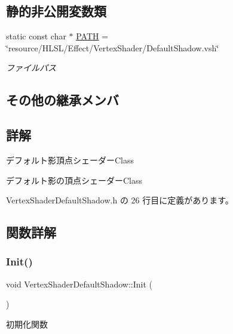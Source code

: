 \subsection*{静的非公開変数類}
\begin{DoxyCompactItemize}
\item 
static const char $\ast$ \mbox{\hyperlink{class_vertex_shader_default_shadow_ad456e5159f0ce67d6ad53f39732bccb1}{P\+A\+TH}} = \char`\"{}resource/H\+L\+SL/Effect/Vertex\+Shader/Default\+Shadow.\+vsh\char`\"{}
\begin{DoxyCompactList}\small\item\em ファイルパス \end{DoxyCompactList}\end{DoxyCompactItemize}
\subsection*{その他の継承メンバ}


\subsection{詳解}
デフォルト影頂点シェーダー\+Class 

デフォルト影の頂点シェーダー\+Class 

 Vertex\+Shader\+Default\+Shadow.\+h の 26 行目に定義があります。



\subsection{関数詳解}
\mbox{\label{class_vertex_shader_default_shadow_ad0033ccbf57a28ab9879313d3f300338}} 
\subsubsection{\texorpdfstring{Init()}{Init()}}
{\footnotesize\ttfamily void Vertex\+Shader\+Default\+Shadow\+::\+Init (\begin{DoxyParamCaption}{ }\end{DoxyParamCaption})\hspace{0.3cm}{\ttfamily [virtual]}}



初期化関数 


